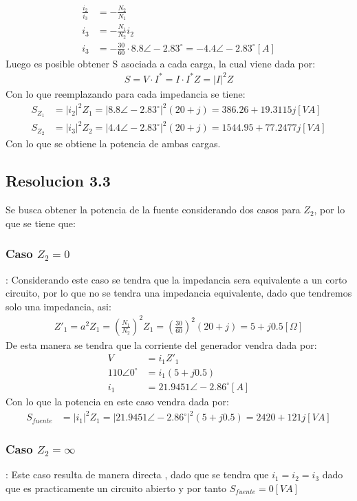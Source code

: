 \documentclass[
  11pt,
  letterpaper,
   addpoints,
   answers
  ]{exam}
\begin{document}
\begin{questions}
\begin{solution}
\begin{align}
    \frac{i_{2}}{i_{3}} &= -\frac{N_{2}}{N_{1}}\\
    i_{3} &= -\frac{N_{1}}{N_{2}}i_{2}\\
    i_{3} &= -\frac{30}{60} \cdot 8.8\angle -2.83^{\circ} = -4.4\angle -2.83^{\circ} [A]
\end{align}
Luego es posible obtener S asociada a cada carga, la cual viene dada por:
\begin{align}
    S= V \cdot I^{*} = I \cdot I^{*}Z = |I|^{2}Z
\end{align}
Con lo que reemplazando para cada impedancia se tiene:
\begin{align}
    S_{Z_{1}} &= |i_{2}|^{2}Z_{1}= |8.8\angle -2.83^{\circ}|^{2}(20+j) = 386.26 + 19.3115j [VA]\\
    S_{Z_{2}} & = |i_{3}|^{2}Z_{2}= |4.4\angle -2.83^{\circ}|^{2}(20+j) = 1544.95 + 77.2477j [VA]
\end{align}
Con lo que se obtiene la potencia de ambas cargas.
\subsection*{Resolucion 3.3}
Se busca obtener la potencia de la fuente considerando dos casos para $Z_{2}$, por lo que se tiene que:
\subsubsection*{\textbf{Caso $Z_{2}=0$}}:
Considerando este caso se tendra que la impedancia sera equivalente a un corto circuito, por lo que no se tendra una impedancia equivalente, dado que tendremos solo una impedancia, asi:
\begin{align}
    Z'_{1}= a^{2}Z_{1}= \left(\frac{N_{1}}{N_{2}}\right)^{2}Z_{1} = \left(\frac{30}{60}\right)^{2}(20 + j) = 5 + j0.5 [\Omega]
\end{align}
De esta manera se tendra que la corriente del generador vendra dada por:
\begin{align}
    V &= i_{1}Z'_{1}\\
    110\angle 0^{\circ} &= i_{1}(5 + j0.5)\\
    i_{1} &= 21.9451\angle -2.86^{\circ} [A]
\end{align}
Con lo que la potencia en este caso vendra dada por:
\begin{align}
    S_{fuente} &= |i_{1}|^{2}Z_{1} = |21.9451\angle -2.86^{\circ}|^{2}(5+j0.5) = 2420 + 121j [VA]
\end{align}
\subsubsection*{\textbf{Caso $Z_{2}=\infty$}}:
Este caso resulta de manera directa , dado que se tendra que $i_{1}= i_{2}=i_{3}$ dado que es practicamente un circuito abierto y por tanto $S_{fuente} = 0 [VA]$

\end{solution}

\end{questions}
\newpage
\end{document}
